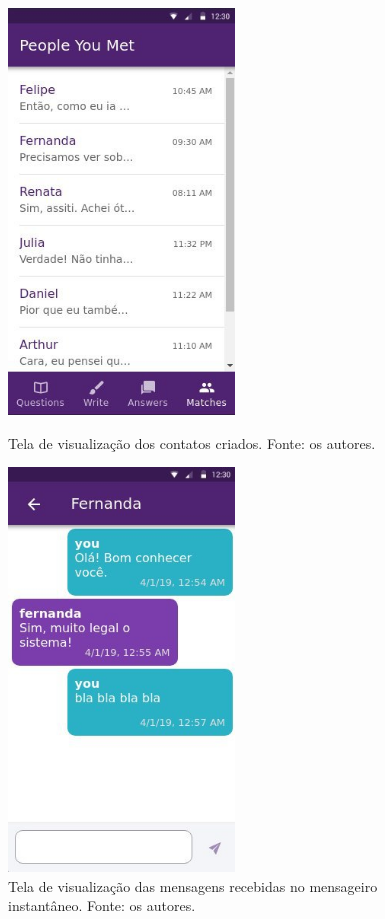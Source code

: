 \begin{figure}
\begin{minipage}{0.45\textwidth}
\centering
\includegraphics[width=6cm]{telaContatos.png}
\caption{Tela de visualização dos contatos criados. Fonte: os autores.}
\label{fig:telaContatos}
\end{minipage}\hfill
\begin{minipage}{0.45\textwidth}
\centering
\includegraphics[width=6cm]{telaChat.png}
\caption{Tela de visualização das mensagens recebidas no mensageiro instantâneo. Fonte: os autores.}
\label{fig:telaChat}
\end{minipage}\hfill
\end{figure}

